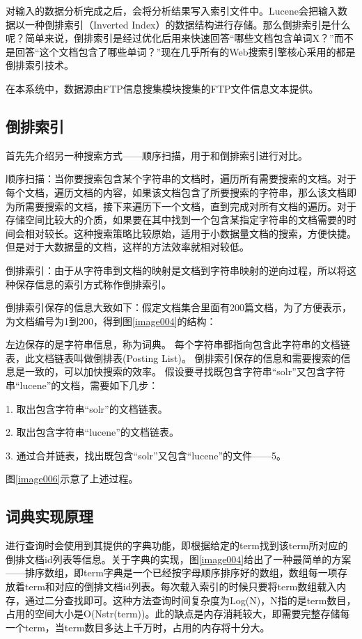 对输入的数据分析完成之后，会将分析结果写入索引文件中。Lucene会把输入数据以一种倒排索引（Inverted Index）的数据结构进行存储。那么倒排索引是什么呢？简单来说，倒排索引是经过优化后用来快速回答“哪些文档包含单词X？”而不是回答“这个文档包含了哪些单词？”现在几乎所有的Web搜索引擎核心采用的都是倒排索引技术。


在本系统中，数据源由FTP信息搜集模块搜集的FTP文件信息文本提供。

\subsection{倒排索引}
首先先介绍另一种搜索方式——顺序扫描，用于和倒排索引进行对比。

顺序扫描：当你要搜索包含某个字符串的文档时，遍历所有需要搜索的文档。对于每个文档，遍历文档的内容，如果该文档包含了所要搜索的字符串，那么该文档即为所需要搜索的文档，接下来遍历下一个文档，直到完成对所有文档的遍历。对于存储空间比较大的介质，如果要在其中找到一个包含某指定字符串的文档需要的时间会相对较长。这种搜索策略比较原始，适用于小数据量文档的搜索，方便快捷。但是对于大数据量的文档，这样的方法效率就相对较低。

倒排索引：由于从字符串到文档的映射是文档到字符串映射的逆向过程，所以将这种保存信息的索引方式称作倒排索引。

倒排索引保存的信息大致如下：假定文档集合里面有200篇文档，为了方便表示，为文档编号为1到200，得到图\ref{image004}的结构：


左边保存的是字符串信息，称为词典。
每个字符串都指向包含此字符串的文档链表，此文档链表叫做倒排表(Posting List)。
倒排索引保存的信息和需要搜索的信息是一致的，可以加快搜索的效率。
假设要寻找既包含字符串“solr”又包含字符串“lucene”的文档，需要如下几步：

1.	取出包含字符串“solr”的文档链表。

2.	取出包含字符串“lucene”的文档链表。

3.	通过合并链表，找出既包含“solr”又包含“lucene”的文件——5。

图\ref{image006}示意了上述过程。


\subsection{词典实现原理}
进行查询时会使用到其提供的字典功能，即根据给定的term找到该term所对应的倒排文档id列表等信息。关于字典的实现，图\ref{image004}给出了一种最简单的方案——排序数组，即term字典是一个已经按字母顺序排序好的数组，数组每一项存放着term和对应的倒排文档id列表。每次载入索引的时候只要将term数组载入内存，通过二分查找即可。这种方法查询时间复杂度为Log(N)，N指的是term数目，占用的空间大小是O(N\*str(term))。此的缺点是内存消耗较大，即需要完整存储每一个term，当term数目多达上千万时，占用的内存将十分大。

